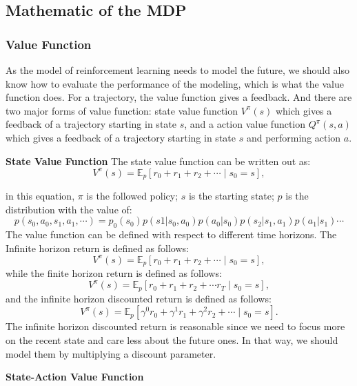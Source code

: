 \documentclass[11pt]{article}
\begin{document}

\subsection{Mathematic of the MDP}

\subsubsection{Value Function}

As the model of reinforcement learning needs to model the future, we should also know how to evaluate the performance of the modeling, which is what the value function does.
%
For a trajectory, the value function gives a feedback. And there are two major forms of value function: state value function $V^{\pi}(s)$ which gives a feedback of a trajectory starting in state $s$, and a action value function $Q^{\pi}(s, a)$ which gives a feedback of a trajectory starting in state $s$ and performing action $a$.

\textbf{State Value Function}
The state value function can be written out as:
$$V^{\pi}(s)=\mathbb{E}_{p}\left[r_{0}+r_{1}+r_{2}+\cdots \mid s_{0}=s\right], $$

in this equation, $\pi$ is the followed policy; $s$ is the starting state; $p$ is the distribution with the value of:
$$p(s_0, a_0, s_1, a_1, \cdots) = p_0(s_0) p(s1|s_0,a_0) p(a_0|s_0) p(s_2|s_1,a_1) p(a_1|s_1)\cdots$$
%
The value function can be defined with respect to different time horizons. The Infinite horizon return is defined as follows:
$$ V^{\pi}(s)=\mathbb{E}_{p}\left[r_{0}+r_{1}+r_{2}+\cdots \mid s_{0}=s\right],$$
while the finite horizon return is defined as follows:
$$ V^{\pi}(s)=\mathbb{E}_{p}\left[r_{0}+r_{1}+r_{2}+\cdots r_{T} \mid s_{0}=s\right],$$
and the infinite horizon discounted return is defined as follows:
$$ V^{\pi}(s)=\mathbb{E}_{p}\left[\gamma^{0} r_{0}+\gamma^{1} r_{1}+\gamma^{2} r_{2}+\cdots \mid s_{0}=s\right].$$
The infinite horizon discounted return is reasonable since we need to focus more on the recent state and care less about the future ones. In that way, we should model them by multiplying a discount parameter.



\textbf{State-Action Value Function}
\end{document}
